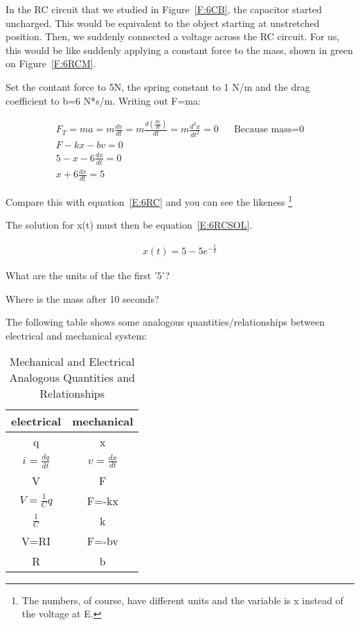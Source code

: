 In the RC circuit that we studied in Figure~\ref{F:6CB}, the capacitor started uncharged. This would be equivalent to the object starting at unstretched position. Then, we suddenly connected a voltage across the RC circuit. For us, this would be like suddenly applying a constant force to the mass, shown in green on Figure~\ref{F:6RCM}.\par

Set the contant force to 5N, the spring constant to 1 N/m and the drag coefficient to b=6 N*s/m. Writing out F=ma:

\begin{align*}
F_T=ma=m\frac{dv}{dt}=m\frac{d(\frac{dx}{dt})}{dt}=m\frac{d^2x}{dt^2}=0&&\text{Because mass=0}\\
F-kx-bv=0\\
5-x-6\frac{dx}{dt}=0\\
x+6\frac{dx}{dt}=5
\end{align*}

Compare this with equation~\eqref{E:6RC} and you can see the likeness \footnote{The numbers, of course, have different units and the variable is x instead of the voltage at E.}

The solution for x(t) must then be equation~\eqref{E:6RCSOL}.

\begin{align}
x(t)=5-5e^{-\frac{t}{6}}
\end{align}

\begin{alevel}
What are the units of the the first '5'?
\end{alevel}

\begin{blevel}
Where is the mass after 10 seconds?
\end{blevel}

The following table shows some analogous quantities/relationships between electrical and mechanical system:

\begin{table}[H]
\begin{center}
\begin{tabular}{|c|c|} \hline
electrical& mechanical \\ \hline
q&x \\ \hline
$i=\frac{dq}{dt}$& $v=\frac{dx}{dt}$ \\ \hline
V&F\\ \hline
$V=\frac{1}{C}q$&F=-kx\\ \hline
$\frac{1}{C}$&k\\ \hline
V=RI&F=-bv\\ \hline
R&b\\ \hline
\end{tabular}
\caption{Mechanical and Electrical Analogous Quantities and Relationships}
\end{center}
\end{table}

